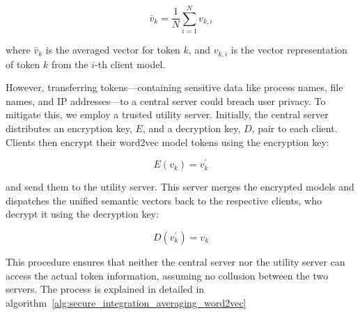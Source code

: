\[
\bar{v}_k = \frac{1}{N} \sum_{i=1}^{N} v_{k,i}
\]

where \(\bar{v}_k\) is the averaged vector for token \(k\), and \(v_{k,i}\) is the vector representation of token \(k\) from the \(i\)-th client model.

However, transferring tokens—containing sensitive data like process names, file names, and IP addresses—to a central server could breach user privacy. To mitigate this, we employ a trusted utility server. Initially, the central server distributes an encryption key, \(E\), and a decryption key, \(D\), pair to each client. Clients then encrypt their word2vec model tokens using the encryption key:

\[
E(v_{k}) = v_{k}^{'}
\]

and send them to the utility server. This server merges the encrypted models and dispatches the unified semantic vectors back to the respective clients, who decrypt it using the decryption key:

\[
D(v_{k}^{'}) = v_{k}
\]

This procedure ensures that neither the central server nor the utility server can access the actual token information, assuming no collusion between the two servers. The process is explained in detailed in algorithm~\ref{alg:secure_integration_averaging_word2vec}

